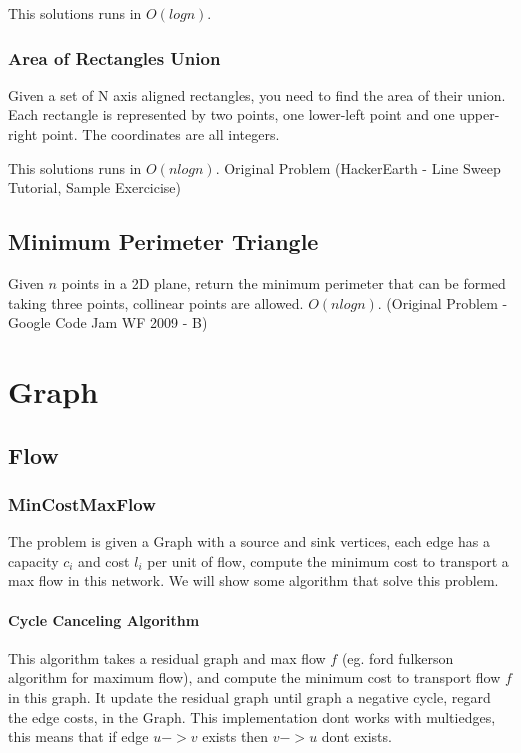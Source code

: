 \documentclass{report}
\newcommand{\RomanNumeralCaps}[1]
    {\MakeUppercase{\romannumeral #1}}
\begin{document}
            This solutions runs in $O(logn)$.
            
            
        \newpage
        \subsection{Area of Rectangles Union}
        Given a set of N axis aligned rectangles, you need to find the area of their union. Each rectangle is represented by two points, one lower-left point and one upper-right point. The coordinates are all integers.
        
        This solutions runs in $O(nlogn)$. Original Problem (HackerEarth - Line Sweep Tutorial, Sample Exercicise)
        
        
    \newpage
    \section{Minimum Perimeter Triangle}
    Given $n$ points in a 2D plane, return the minimum perimeter that can be formed taking three points, collinear points are allowed. $O(nlogn)$. (Original Problem - Google Code Jam WF 2009 - B)
    
    \chapter{Graph \RomanNumeralCaps{9}}
    \section{Flow}
        \subsection{MinCostMaxFlow}
            The problem is given a Graph with a source and sink vertices, each edge has a capacity $c_i$ and cost $l_i$ per unit of flow, compute the minimum cost to transport a max flow in this network. We will show some algorithm that solve this problem.
            \subsubsection{Cycle Canceling Algorithm}
            This algorithm takes a residual graph and max flow $f$ (eg. ford fulkerson algorithm for maximum flow), and compute the minimum cost to transport flow $f$ in this graph. It update the residual graph until graph a negative cycle, regard the edge costs, in the Graph. This implementation dont works with multiedges, this means that if edge $u->v$ exists then $v->u$ dont exists.
            
\end{document}
